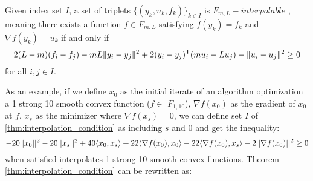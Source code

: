 \begin{theorem}
	\label{thm:interpolation_condition}
	Given index set \(I\), a set of triplets \(\{(y_k, u_k, f_k)\}_{k \in I}\) is \(F_{m,L}-interpolable\) , meaning there exists a function \(f \in F_{m,L}\)  satisfying \(f(y_k) = f_k\) and \(\nabla f(y_k) = u_k\) if and only if
	\[
	 	2(L-m)(f_i - f_j) - mL\|y_i - y_j\|^2 + 2(y_i - y_j)^{\mathsf{T}} (mu_i - Lu_j) - \|u_i - u_j\|^2 \geq 0
	\]
	for all $i,j\in I$. 
\end{theorem}

As an example, if we define $x_0$ as the initial iterate of an algorithm optimization a 1 strong 10 smooth convex function (\(f \in \) \(F_{1,10}\)), $\nabla f(x_0)$ as the gradient of $x_0$ at $f$, $x_s$ as the minimizer where  $\nabla f(x_s) = 0$, we can define set $I$ of \ref{thm:interpolation_condition} as including $s$ and $0$  and get the inequality:
\begin{equation} \label{eqn:int_cond}
	-20||x_0||^2 -20||x_s||^2 + 40\langle x_0, x_s \rangle + 22\langle \nabla f(x_0), x_0 \rangle - 22\langle \nabla f(x_0), x_s \rangle - 2||\nabla f(x_0)||^2 \geq 0
\end{equation}
when satisfied interpolates 1 strong 10 smooth convex functions. Theorem \ref{thm:interpolation_condition} can be rewritten as:
